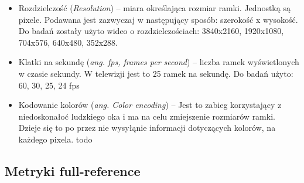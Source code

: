 \begin{itemize}[label=$\bullet$]
\item Rozdzielczość ({\em Resolution}) -- miara określająca rozmiar ramki. Jednostką są pixele. Podawana jest zazwyczaj w następujący sposób: szerokość x wysokość. Do badań zostały użyto wideo o rozdzielczościach: 3840x2160, 1920x1080, 704x576, 640x480, 352x288. 
\item Klatki na sekundę ({\em ang. fps, frames per second}) -- liczba ramek wyświetlonych w czasie sekundy. W telewizji jest to 25 ramek na sekundę. Do badań użyto: 60, 30, 25, 24 fps
\item Kodowanie kolorów ({\em ang. Color encoding}) -- Jest to zabieg korzystający z niedoskonałoć ludzkiego oka i ma na celu zmiejszenie rozmiarów ramki. Dzieje się to po przez nie wysyłąnie informacji dotyczących kolorów, na każdego pixela. todo 
\end{itemize}


\subsection{Metryki full-reference}

